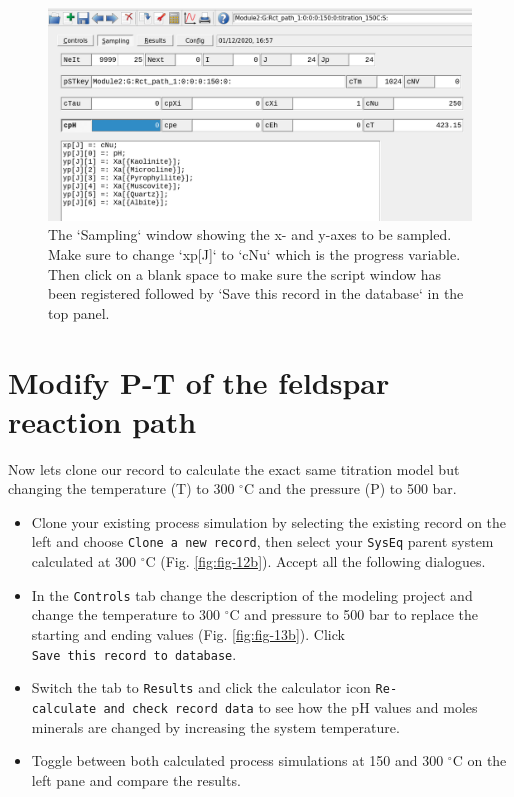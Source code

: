 \documentclass[
]{book}
\begin{document}
\begin{figure}
\includegraphics[width=1\linewidth]{figures/module2/fig-11} \caption{The `Sampling` window showing the x- and y-axes to be sampled. Make sure to change `xp[J]` to `cNu` which is the progress variable. Then click on a blank space to make sure the script window has been registered followed by `Save this record in the database` in the top panel.}\label{fig:fig-11b}
\end{figure}

\hypertarget{modify-p-t-of-the-feldspar-reaction-path}{%
\section{Modify P-T of the feldspar reaction path}\label{modify-p-t-of-the-feldspar-reaction-path}}

Now lets clone our record to calculate the exact same titration model but changing the temperature (T) to 300 \(^\circ\)C and the pressure (P) to 500 bar.

\begin{itemize}
\item
  Clone your existing process simulation by selecting the existing record on the left and choose \texttt{Clone\ a\ new\ record}, then select your \texttt{SysEq} parent system calculated at 300 \(^\circ\)C (Fig. \ref{fig:fig-12b}). Accept all the following dialogues.
\item
  In the \texttt{Controls} tab change the description of the modeling project and change the temperature to 300 \(^\circ\)C and pressure to 500 bar to replace the starting and ending values (Fig. \ref{fig:fig-13b}). Click \texttt{Save\ this\ record\ to\ database}.
\item
  Switch the tab to \texttt{Results} and click the calculator icon \texttt{Re-calculate\ and\ check\ record\ data} to see how the pH values and moles minerals are changed by increasing the system temperature.
\item
  Toggle between both calculated process simulations at 150 and 300 \(^\circ\)C on the left pane and compare the results.
\end{itemize}
\end{document}
